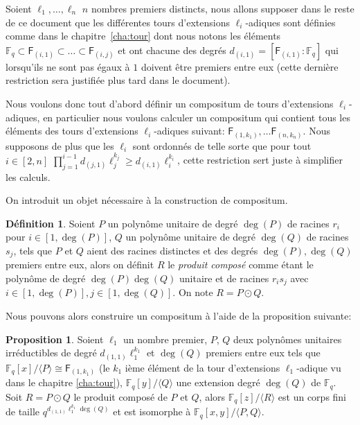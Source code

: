 \documentclass[10pt,a4paper]{book}
\theoremstyle{plain}
\theoremstyle{definition}
\theoremstyle{definition}
\theoremstyle{definition}
\theoremstyle{definition}
\newtheorem{prop}[thm]{Proposition}
\theoremstyle{definition}
\newtheorem{defi}[thm]{Définition}
\theoremstyle{remark}
\theoremstyle{remark}
\theoremstyle{definition}
\begin{document}
Soient $\ell_1, \dots, \ell_n$ $n$ nombres premiers distincts, 
nous allons supposer dans le reste de ce document que les différentes tours 
d'extensions $\ell_i$-adiques sont définies comme dans le 
chapitre~\ref{cha:tour} dont nous notons les éléments 
$\mathbb{F}_q \subset \mathsf{F}_{(i,1)} \subset \dots \subset  \mathsf{F}_{(i,j)}$ 
et ont chacune des degrés $d_{(i,1)}=[\mathsf{F}_{(i,1)}:\mathbb{F}_q]$ qui lorsqu'ils 
ne sont pas égaux à $1$ doivent être premiers entre eux (cette dernière 
restriction sera justifiée plus tard dans le document).

Nous voulons donc tout d'abord définir un compositum de tours d'extensions 
$\ell_i$-adiques, en particulier nous voulons calculer un compositum qui 
contient tous les éléments des tours d'extensions $\ell_i$-adiques suivant:
$\mathsf{F}_{(1,k_1)}, \dots \mathsf{F}_{(n,k_n)}$. Nous supposons de plus que 
les $\ell_i$ sont ordonnés de telle sorte que pour tout $i \in [2,n]$ 
$\prod_{j=1}^{i-1}d_{(j,1)}\ell_j^{k_j} \geqslant d_{(i,1)}\ell_i^{k_i}$, cette restriction
sert juste à simplifier les calculs.

On introduit un objet nécessaire à la construction de compositum.
\begin{defi}
Soient $P$ un polynôme unitaire de degré $\deg(P)$ de racines $r_i$ pour 
$i \in [1,\deg(P)]$, $Q$ un polynôme unitaire de degré $\deg(Q)$ de racines 
$s_j$, tels que $P$ et $Q$ aient des racines distinctes et des degrés $\deg(P),
\deg(Q)$ premiers entre eux, alors on définit $R$ le \emph{produit composé} 
comme étant le polynôme de degré $\deg(P)\deg(Q)$ unitaire et de racines 
$r_is_j$ avec $i \in [1,\deg(P)], j \in [1,\deg(Q)]$. On note $R= P\odot Q$.  
\end{defi}
Nous pouvons alors construire un compositum à l'aide de la proposition 
suivante: 
\begin{prop}
\label{pro:init:com}
Soient $\ell_1$ un nombre premier, $P$, $Q$ deux 
polynômes unitaires irréductibles de degré $d_{(1,1)}\ell_1^{k_1}$ et $\deg(Q)$ 
premiers entre eux tels que $\mathbb{F}_q[x]/\langle P \rangle \cong 
\mathsf{F}_{(1,k_1)}$ (le $k_1$ ième élément de la tour d'extensions 
$\ell_1$-adique vu dans le chapitre \ref{cha:tour}), $\mathbb{F}_q[y]/\langle Q 
\rangle$ une extension degré $\deg(Q)$ de $\mathbb{F}_q$.
 Soit $R=P\odot Q$  le produit composé de $P$ et $Q$, alors 
 $\mathbb{F}_q[z]/\langle R \rangle$ est un corps fini de taille 
 $q^{d_{(1,1)}\ell_1^{k_1}\deg(Q)}$ et est isomorphe à $\mathbb{F}_q[x,y]/
 \langle P,Q \rangle$.
\end{prop}
\end{document}
